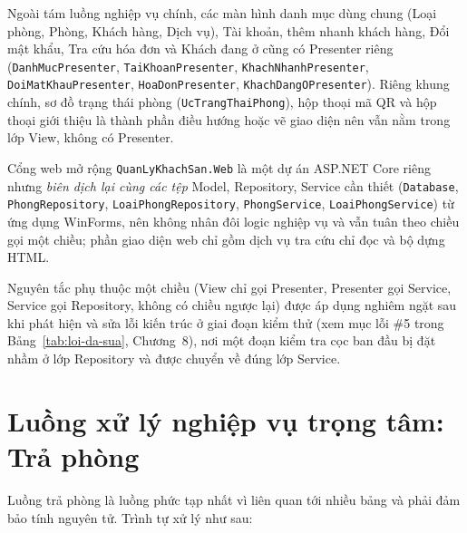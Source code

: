 \documentclass[14pt]{report}
\begin{document}
Ngoài tám luồng nghiệp vụ chính, các màn hình danh mục dùng chung (Loại phòng, Phòng, Khách hàng, Dịch vụ), Tài khoản, thêm nhanh khách hàng, Đổi mật khẩu, Tra cứu hóa đơn và Khách đang ở cũng có Presenter riêng (\texttt{DanhMucPresenter}, \texttt{TaiKhoanPresenter}, \texttt{KhachNhanhPresenter}, \texttt{DoiMatKhauPresenter}, \texttt{HoaDonPresenter}, \texttt{KhachDangOPresenter}). Riêng khung chính, sơ đồ trạng thái phòng (\texttt{UcTrangThaiPhong}), hộp thoại mã QR và hộp thoại giới thiệu là thành phần điều hướng hoặc vẽ giao diện nên vẫn nằm trong lớp View, không có Presenter.

Cổng web mở rộng \texttt{QuanLyKhachSan.Web} là một dự án ASP.NET Core riêng nhưng \emph{biên dịch lại cùng các tệp} Model, Repository, Service cần thiết (\texttt{Database}, \texttt{PhongRepository}, \texttt{LoaiPhongRepository}, \texttt{PhongService}, \texttt{LoaiPhongService}) từ ứng dụng WinForms, nên không nhân đôi logic nghiệp vụ và vẫn tuân theo chiều gọi một chiều; phần giao diện web chỉ gồm dịch vụ tra cứu chỉ đọc và bộ dựng HTML.

Nguyên tắc phụ thuộc một chiều (View chỉ gọi Presenter, Presenter gọi Service, Service gọi Repository, không có chiều ngược lại) được áp dụng nghiêm ngặt sau khi phát hiện và sửa lỗi kiến trúc ở giai đoạn kiểm thử (xem mục lỗi \#5 trong Bảng~\ref{tab:loi-da-sua}, Chương~8), nơi một đoạn kiểm tra cọc ban đầu bị đặt nhầm ở lớp Repository và được chuyển về đúng lớp Service.

\section{Luồng xử lý nghiệp vụ trọng tâm: Trả phòng}

Luồng trả phòng là luồng phức tạp nhất vì liên quan tới nhiều bảng và phải đảm bảo tính nguyên tử. Trình tự xử lý như sau:
\end{document}
